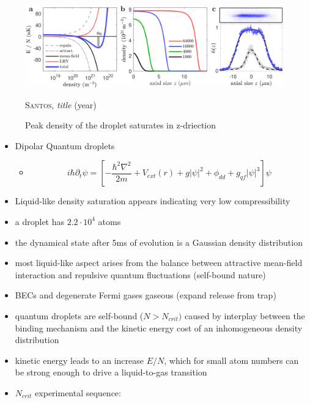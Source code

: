 \begin{figure}[H]
    \centering
    \includegraphics[width=1.0\textwidth]{IMAGE/droplet.png}\\
    \caption{Peak density of the droplet saturates in z-driection}
    \textsc{Santos}, \emph{title} (year)
    \label{fig:droplet}
\end{figure}

\begin{itemize}
    \item Dipolar Quantum droplets
    \begin{itemize}
        \item[]
            \begin{equation}
              i \hbar \partial_{t} \psi = \left[ - \frac{\hbar^{2} \nabla^{2}}{2 m} + V_{ext}(r) + g |\psi|^{2} + \phi_{dd} + g_{qf} |\psi|^{3} \right] \psi
            \end{equation}
    \end{itemize}
    \item Liquid-like density saturation appears indicating very low compressibility
    \item a droplet has $2.2 \cdot 10^{4}$ atoms
    \item the dynamical state after 5ms of evolution is a Gaussian density distribution
    \item most liquid-like aspect arises from the balance between attractive
        mean-field interaction and repulsive quantum fluctuations (self-bound nature)
    \item BECs and degenerate Fermi gases gaseous (expand release from trap)
    \item quantum droplets are self-bound ($N > N_{crit})$ caused by interplay between the binding mechanism and the kinetic energy cost of an inhomogeneous density distribution
    \item kinetic energy leads to an increase $E/N$, which for small atom numbers can be strong enough to drive a liquid-to-gas transition
    \item $N_{crit}$ experimental sequence:
        \begin{enumerate}

\end{enumerate}
\end{itemize}

